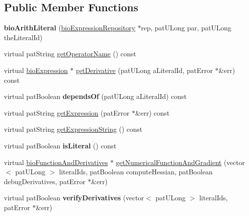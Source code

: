 \subsection*{Public Member Functions}
\begin{DoxyCompactItemize}
\item 
\mbox{\label{classbio_arith_literal_af66772afce990e444ee7d68d3b2b5144}} 
{\bfseries bio\+Arith\+Literal} (\hyperlink{classbio_expression_repository}{bio\+Expression\+Repository} $\ast$rep, pat\+U\+Long par, pat\+U\+Long the\+Literal\+Id)
\item 
virtual pat\+String \hyperlink{classbio_arith_literal_a0cdf0cb347fbf2b6db50b31ef8824d9c}{get\+Operator\+Name} () const
\item 
virtual \hyperlink{classbio_expression}{bio\+Expression} $\ast$ \hyperlink{classbio_arith_literal_affebfbf01e421ec9cf55b4cf883039ce}{get\+Derivative} (pat\+U\+Long a\+Literal\+Id, pat\+Error $\ast$\&err) const
\item 
\mbox{\label{classbio_arith_literal_ac348b105f8b4d5f36b2c8b88ce5c8a97}} 
virtual pat\+Boolean {\bfseries depends\+Of} (pat\+U\+Long a\+Literal\+Id) const
\item 
virtual pat\+String \hyperlink{classbio_arith_literal_ae55e7cbd7d3561b56af50fc741009a60}{get\+Expression} (pat\+Error $\ast$\&err) const
\item 
virtual pat\+String \hyperlink{classbio_arith_literal_ab75046eaffcb688b83031da7f91653f9}{get\+Expression\+String} () const
\item 
\mbox{\label{classbio_arith_literal_aff6e75c06e5e9a50dcd01590d48262b4}} 
virtual pat\+Boolean {\bfseries is\+Literal} () const
\item 
virtual \hyperlink{classbio_function_and_derivatives}{bio\+Function\+And\+Derivatives} $\ast$ \hyperlink{classbio_arith_literal_acce01225d50f0ba0a263b2fbaa71b79b}{get\+Numerical\+Function\+And\+Gradient} (vector$<$ pat\+U\+Long $>$ literal\+Ids, pat\+Boolean compute\+Hessian, pat\+Boolean debug\+Derivatives, pat\+Error $\ast$\&err)
\item 
\mbox{\label{classbio_arith_literal_aa18cdbbe1c0b9abdbeac945e44aa5c8d}} 
virtual pat\+Boolean {\bfseries verify\+Derivatives} (vector$<$ pat\+U\+Long $>$ literal\+Ids, pat\+Error $\ast$\&err)
\end{DoxyCompactItemize}
